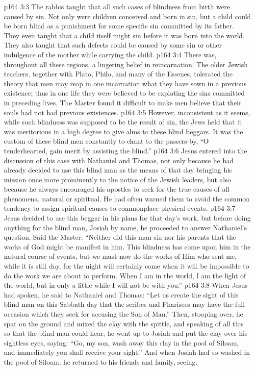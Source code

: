 \pc \vs p164 3:3 The rabbis taught that all such cases of blindness from birth were caused by sin. Not only were children conceived and born in sin, but a child could be born blind as a punishment for some specific sin committed by its father. They even taught that a child itself might sin before it was born into the world. They also taught that such defects could be caused by some sin or other indulgence of the mother while carrying the child.
\vs p164 3:4 There was, throughout all these regions, a lingering belief in reincarnation. The older Jewish teachers, together with Plato, Philo, and many of the Essenes, tolerated the theory that men may reap in one incarnation what they have sown in a previous existence; thus in one life they were believed to be expiating the sins committed in preceding lives. The Master found it difficult to make men believe that their souls had not had previous existences.
\vs p164 3:5 However, inconsistent as it seems, while such blindness was supposed to be the result of sin, the Jews held that it was meritorious in a high degree to give alms to these blind beggars. It was the custom of these blind men constantly to chant to the passers\hyp{}by, “O tenderhearted, gain merit by assisting the blind.”
\pc \vs p164 3:6 Jesus entered into the discussion of this case with Nathaniel and Thomas, not only because he had already decided to use this blind man as the means of that day bringing his mission once more prominently to the notice of the Jewish leaders, but also because he always encouraged his apostles to seek for the true causes of all phenomena, natural or spiritual. He had often warned them to avoid the common tendency to assign spiritual causes to commonplace physical events.
\vs p164 3:7 Jesus decided to use this beggar in his plans for that day’s work, but before doing anything for the blind man, Josiah by name, he proceeded to answer Nathaniel’s question. Said the Master: \textcolor{ubdarkred}{“Neither did this man sin nor his parents that the works of God might be manifest in him. This blindness has come upon him in the natural course of events, but we must now do the works of Him who sent me, while it is still day, for the night will certainly come when it will be impossible to do the work we are about to perform. When I am in the world, I am the light of the world, but in only a little while I will not be with you.”}
\vs p164 3:8 When Jesus had spoken, he said to Nathaniel and Thomas: \textcolor{ubdarkred}{“Let us create the sight of this blind man on this Sabbath day that the scribes and Pharisees may have the full occasion which they seek for accusing the Son of Man.”} Then, stooping over, he spat on the ground and mixed the clay with the spittle, and speaking of all this so that the blind man could hear, he went up to Josiah and put the clay over his sightless eyes, saying: \textcolor{ubdarkred}{“Go, my son, wash away this clay in the pool of Siloam, and immediately you shall receive your sight.”} And when Josiah had so washed in the pool of Siloam, he returned to his friends and family, seeing.
